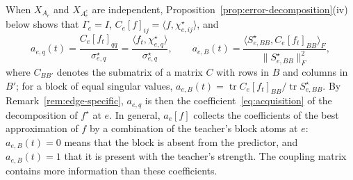 \documentclass[11pt]{article}
\newcommand{\norm}[1]{\lVert #1\rVert}
\theoremstyle{definition}
\numberwithin{equation}{section}
\begin{document}
When $X_{A_e}$ and $X_{A_e^c}$ are independent, Proposition~\ref{prop:error-decomposition}(iv) below shows that $\Gamma_e=I$, $C_e[f]_{ij}=\langle f,\chi^\star_{e,ij}\rangle$, and
\[
a_{e,q}(t)=\frac{C_e[f_t]_{qq}}{\sigma^\star_{e,q}}=\frac{\langle f_t,\chi^\star_{e,q}\rangle}{\sigma^\star_{e,q}},\qquad
a_{e,B}(t)=\frac{\big\langle S^\star_{e,BB},C_e[f_t]_{BB}\big\rangle_F}{\norm{S^\star_{e,BB}}_F^2},
\]
where $C_{BB'}$ denotes the submatrix of a matrix $C$ with rows in $B$ and columns in $B'$; for a block of equal singular values, $a_{e,B}(t)=\operatorname{tr}C_e[f_t]_{BB}/\operatorname{tr}S^\star_{e,BB}$. By Remark~\ref{rem:edge-specific}, $a_{e,q}$ is then the coefficient~\eqref{eq:acquisition} of the decomposition of $f^\star$ at $e$. In general, $a_e[f]$ collects the coefficients of the best approximation of $f$ by a combination of the teacher's block atoms at $e$: $a_{e,B}(t)=0$ means that the block is absent from the predictor, and $a_{e,B}(t)=1$ that it is present with the teacher's strength. The coupling matrix contains more information than these coefficients.
\end{document}
